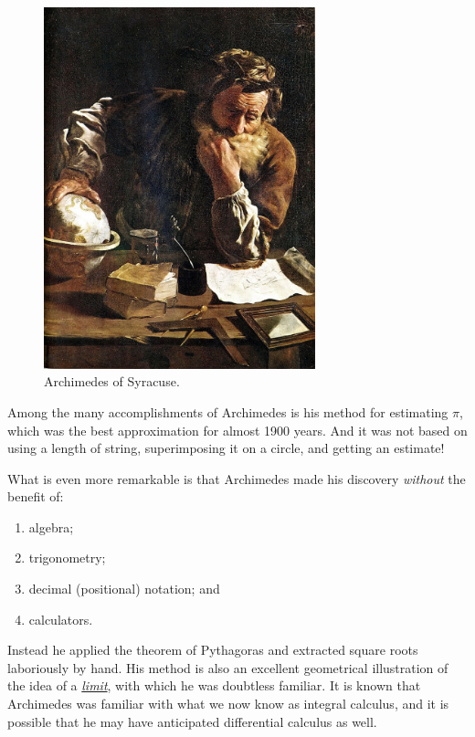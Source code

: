 \documentclass[
  a4paper,
]{article}
\begin{document}
\begin{figure}
\centering
\includegraphics[width=0.7\textwidth,height=\textheight]{images/Domenico-Fetti_Archimedes_1620.jpg}
\caption[Archimedes of Syracuse.]{Archimedes of
Syracuse.\footnotemark{}}\label{fig:archimedes}
\end{figure}

Among the many accomplishments of Archimedes is his method for
estimating \(\pi\), which was the best approximation for almost 1900
years. And it was not based on using a length of string, superimposing
it on a circle, and getting an estimate! \normalfont 

What is even more remarkable is that Archimedes made his discovery
\emph{without} the benefit of:

\begin{enumerate}
\def\labelenumi{(\alph{enumi})}
\item
  algebra;
\item
  trigonometry;
\item
  decimal (positional) notation; and
\item
  calculators.
\end{enumerate}

Instead he applied the theorem of Pythagoras and extracted square roots
laboriously by hand. His method is also an excellent geometrical
illustration of the idea of a
\href{https://www.britannica.com/science/limit-mathematics}{\emph{limit}},
with which he was doubtless familiar. It is known that Archimedes was
familiar with what we now know as integral calculus, and it is possible
that he may have anticipated differential calculus as well.
\end{document}

